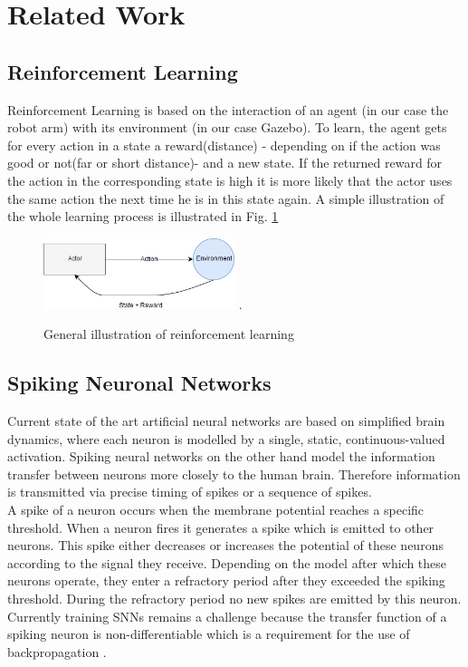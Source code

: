 \section{Related Work}
\subsection{Reinforcement Learning}%
Reinforcement Learning is based on the interaction of an agent (in our case the robot arm) with its environment (in our case Gazebo). To learn, the agent gets for every action in a state a reward(distance) - depending on if the action was good or not(far or short distance)- and a new state. If the returned reward for the action in the corresponding state is high it is more likely that the actor uses the same action the next time he is in this state again. A simple illustration of the whole learning process is illustrated in Fig. \ref{re_base}
\begin{figure}[H]
	\centering
	\includegraphics[width=2.2in]{img/re_base.png}
	\DeclareGraphicsExtensions.
	\caption{General illustration of reinforcement learning}
	\label{re_base}
\end{figure}

\subsection{Spiking Neuronal Networks}
Current state of the art artificial neural networks are based on simplified brain dynamics, where each neuron is modelled by a single, static, continuous-valued activation. Spiking neural networks on the other hand model the information transfer between neurons more closely to the human brain. Therefore information is transmitted via precise timing of spikes or a sequence of spikes.\\
A spike of a neuron occurs when the membrane potential reaches a specific threshold. When a neuron fires it generates a spike which is emitted to other neurons. This spike either decreases or increases the potential of these neurons according to the signal they receive. Depending on the model after %
which these neurons operate, they enter a refractory period after they exceeded the spiking threshold. During the refractory period no new spikes are emitted by this neuron.\\
Currently training SNNs remains a challenge because the transfer function of a spiking neuron is non-differentiable which is a requirement for the use of backpropagation \cite{DBLP:journals/corr/abs-1804-08150}.


